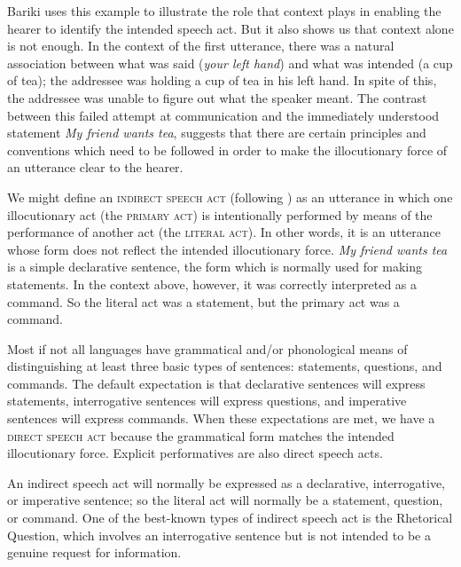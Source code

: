 Bariki uses this example to illustrate the role that context plays in enabling the hearer to identify the intended speech act. But it also shows us that context alone is not enough. In the context of the first utterance, there was a natural association between what was said (\textit{your left hand}) and what was intended (a cup of tea); the addressee was holding a cup of tea in his left hand. In spite of this, the addressee was unable to figure out what the speaker meant. The contrast between this failed attempt at communication and the immediately understood statement \textit{My friend wants tea}, suggests that there are certain principles and conventions which need to be followed in order to make the illocutionary force of an utterance clear to the hearer.



We might define an \textsc{indirect speech act} (following \citealt{Searle1975}) as an utterance in which one illocutionary act (the \textsc{primary act}) is intentionally performed by means of the performance of another act (the \textsc{literal act}). In other words, it is an utterance whose form does not reflect the intended illocutionary force. \textit{My friend wants tea} is a simple declarative sentence, the form which is normally used for making statements. In the context above, however, it was correctly interpreted as a command. So the literal act was a statement, but the primary act was a command.



Most if not all languages have grammatical and/or phonological means of distinguishing at least three basic types of sentences: statements, questions, and commands. The default expectation is that declarative sentences will express statements, interrogative sentences will express questions, and imperative sentences will express commands. When these expectations are met, we have a \textsc{direct speech act} because the grammatical form matches the intended illocutionary force. Explicit performatives are also direct speech acts.



An indirect speech act will normally be expressed as a declarative, interrogative, or imperative sentence; so the literal act will normally be a statement, question, or command. One of the best-known types of indirect speech act is the Rhetorical Question, which involves an interrogative sentence but is not intended to be a genuine request for information.



